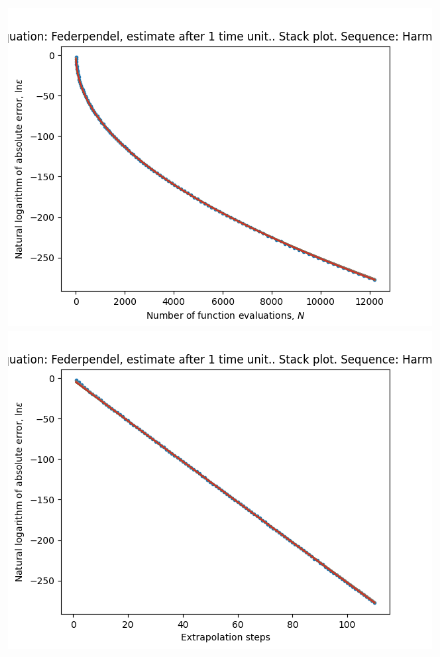 \begin{figure}[H]
\centering
\begin{minipage}{0.45\textwidth}
\centering
\includegraphics[scale=0.45]{../results/emr_plots/federpendel_1_hp_harmonic_stack.png}
\end{minipage}
\begin{minipage}{0.45\textwidth}
\centering
\includegraphics[scale=0.45]{../results/emr_plots/federpendel_1_hp_harmonic_steps_stack.png}
\end{minipage}
\end{figure}


